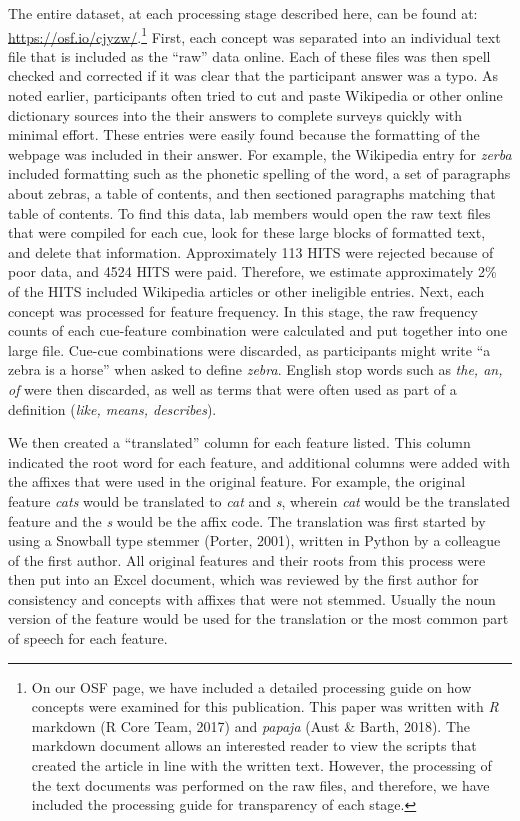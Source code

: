 \documentclass[english,,man]{apa6}
\let\rmarkdownfootnote\footnote%
\def\footnote{\protect\rmarkdownfootnote}
\begin{document}
The entire dataset, at each processing stage described here, can be found at: \url{https://osf.io/cjyzw/}.\footnote{On our OSF page, we have included a detailed processing guide on how concepts were examined for this publication. This paper was written with \emph{R} markdown (R Core Team, 2017) and \emph{papaja} (Aust \& Barth, 2018). The markdown document allows an interested reader to view the scripts that created the article in line with the written text. However, the processing of the text documents was performed on the raw files, and therefore, we have included the processing guide for transparency of each stage.} First, each concept was separated into an individual text file that is included as the \enquote{raw} data online. Each of these files was then spell checked and corrected if it was clear that the participant answer was a typo. As noted earlier, participants often tried to cut and paste Wikipedia or other online dictionary sources into the their answers to complete surveys quickly with minimal effort. These entries were easily found because the formatting of the webpage was included in their answer. For example, the Wikipedia entry for \emph{zerba} included formatting such as the phonetic spelling of the word, a set of paragraphs about zebras, a table of contents, and then sectioned paragraphs matching that table of contents. To find this data, lab members would open the raw text files that were compiled for each cue, look for these large blocks of formatted text, and delete that information. Approximately 113 HITS were rejected because of poor data, and 4524 HITS were paid. Therefore, we estimate approximately 2\% of the HITS included Wikipedia articles or other ineligible entries. Next, each concept was processed for feature frequency. In this stage, the raw frequency counts of each cue-feature combination were calculated and put together into one large file. Cue-cue combinations were discarded, as participants might write \enquote{a zebra is a horse} when asked to define \emph{zebra}. English stop words such as \emph{the, an, of} were then discarded, as well as terms that were often used as part of a definition (\emph{like, means, describes}).

We then created a \enquote{translated} column for each feature listed. This column indicated the root word for each feature, and additional columns were added with the affixes that were used in the original feature. For example, the original feature \emph{cats} would be translated to \emph{cat} and \emph{s}, wherein \emph{cat} would be the translated feature and the \emph{s} would be the affix code. The translation was first started by using a Snowball type stemmer (Porter, 2001), written in Python by a colleague of the first author. All original features and their roots from this process were then put into an Excel document, which was reviewed by the first author for consistency and concepts with affixes that were not stemmed. Usually the noun version of the feature would be used for the translation or the most common part of speech for each feature.
\end{document}
